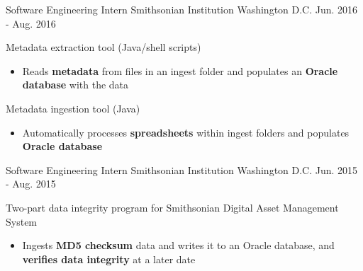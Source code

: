 \begin{cventries}
    \cventry
    {Software Engineering Intern}
    {Smithsonian Institution}
    {Washington D.C.}
    {Jun. 2016 - Aug. 2016}
    {
        \begin{cvitems}
		\item{Metadata extraction tool (Java/shell scripts)}
        \begin{itemize}
			\item{Reads \textbf{metadata} from files in an ingest folder and populates an \textbf{Oracle database} with the data}
        \end{itemize}
		\item{Metadata ingestion tool (Java)}
        \begin{itemize}
			\item{Automatically processes \textbf{spreadsheets} within ingest folders and populates \textbf{Oracle database}}
        \end{itemize}
        \end{cvitems}
    }
    \cventry
    {Software Engineering Intern}
    {Smithsonian Institution}
    {Washington D.C.}
    {Jun. 2015 - Aug. 2015}
    {
      \begin{cvitems}
	  \item {Two-part data integrity program for Smithsonian Digital Asset Management System}
        \begin{itemize}
			\item {Ingests \textbf{MD5 checksum} data and writes it to an Oracle database, and \textbf{verifies data integrity} at a later date}
        \end{itemize}
      \end{cvitems}
    }
	\vspace{-1.0em}
\end{cventries}
